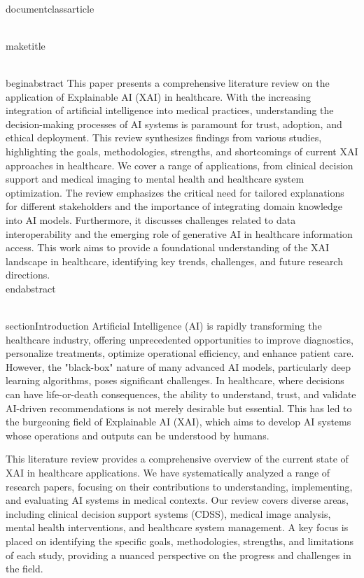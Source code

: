 \\documentclass{article}
\begin{document}
\\maketitle

\\begin{abstract}
This paper presents a comprehensive literature review on the application of Explainable AI (XAI) in healthcare. With the increasing integration of artificial intelligence into medical practices, understanding the decision-making processes of AI systems is paramount for trust, adoption, and ethical deployment. This review synthesizes findings from various studies, highlighting the goals, methodologies, strengths, and shortcomings of current XAI approaches in healthcare. We cover a range of applications, from clinical decision support and medical imaging to mental health and healthcare system optimization. The review emphasizes the critical need for tailored explanations for different stakeholders and the importance of integrating domain knowledge into AI models. Furthermore, it discusses challenges related to data interoperability and the emerging role of generative AI in healthcare information access. This work aims to provide a foundational understanding of the XAI landscape in healthcare, identifying key trends, challenges, and future research directions.
\\end{abstract}

\\section{Introduction}
Artificial Intelligence (AI) is rapidly transforming the healthcare industry, offering unprecedented opportunities to improve diagnostics, personalize treatments, optimize operational efficiency, and enhance patient care. However, the "black-box" nature of many advanced AI models, particularly deep learning algorithms, poses significant challenges. In healthcare, where decisions can have life-or-death consequences, the ability to understand, trust, and validate AI-driven recommendations is not merely desirable but essential. This has led to the burgeoning field of Explainable AI (XAI), which aims to develop AI systems whose operations and outputs can be understood by humans.

This literature review provides a comprehensive overview of the current state of XAI in healthcare applications. We have systematically analyzed a range of research papers, focusing on their contributions to understanding, implementing, and evaluating AI systems in medical contexts. Our review covers diverse areas, including clinical decision support systems (CDSS), medical image analysis, mental health interventions, and healthcare system management. A key focus is placed on identifying the specific goals, methodologies, strengths, and limitations of each study, providing a nuanced perspective on the progress and challenges in the field.
\end{document}
